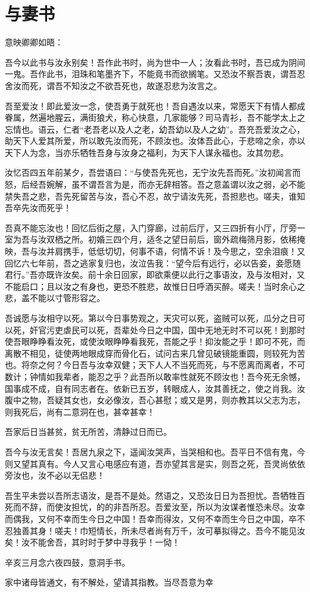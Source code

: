 \section{ 与妻书}

意映卿卿如晤：  

吾今以此书与汝永别矣！吾作此书时，尚为世中一人；汝看此书时，吾已成为阴间一鬼。吾作此书，泪珠和笔墨齐下，不能竟书而欲搁笔。又恐汝不察吾衷，谓吾忍舍汝而死，谓吾不知汝之不欲吾死也，故遂忍悲为汝言之。  

吾至爱汝！即此爱汝一念，使吾勇于就死也！吾自遇汝以来，常愿天下有情人都成眷属，然遍地腥云，满街狼犬，称心快意，几家能够？司马青衫，吾不能学太上之忘情也。语云，仁者“老吾老以及人之老，幼吾幼以及人之幼”。吾充吾爱汝之心，助天下人爱其所爱，所以敢先汝而死，不顾汝也。汝体吾此心，于悲啼之余，亦以天下人为念，当亦乐牺牲吾身与汝身之福利，为天下人谋永福也。汝其勿悲。  

汝忆否四五年前某夕，吾尝语曰：“与使吾先死也，无宁汝先吾而死。”汝初闻言而怒，后经吾婉解，虽不谓吾言为是，而亦无辞相答。吾之意盖谓以汝之弱，必不能禁失吾之悲，吾先死留苦与汝，吾心不忍，故宁请汝先死，吾担悲也。嗟夫，谁知吾卒先汝而死乎！  

吾真不能忘汝也！回忆后街之屋，入门穿廊，过前后厅，又三四折有小厅，厅旁一室为吾与汝双栖之所。初婚三四个月，适冬之望日前后，窗外疏梅筛月影，依稀掩映，吾与汝并肩携手，低低切切，何事不语，何情不诉！及今思之，空余泪痕！又回忆六七年前，吾之逃家复归也，汝泣告我：“望今后有远行，必以告妾，妾愿随君行。”吾亦既许汝矣。前十余日回家，即欲乘便以此行之事语汝，及与汝相对，又不能启口；且以汝之有身也，更恐不胜悲，故惟日日呼酒买醉。嗟夫！当时余心之悲，盖不能以寸管形容之。  

吾诚愿与汝相守以死。第以今日事势观之，天灾可以死，盗贼可以死，瓜分之日可以死，奸官污吏虐民可以死，吾辈处今日之中国，国中无地无时不可以死！到那时使吾眼睁睁看汝死，或使汝眼睁睁看我死，吾能之乎！抑汝能之乎！即可不死，而离散不相见，徒使两地眼成穿而骨化石，试问古来几曾见破镜能重圆，则较死为苦也。将奈之何？今日吾与汝幸双健；天下人人不当死而死，与不愿离而离者，不可数计；钟情如我辈者，能忍之乎？此吾所以敢率性就死不顾汝也！吾今死无余憾，国事成不成，自有同志者在。依新已五岁，转眼成人，汝其善抚之，使之肖我。汝腹中之物，吾疑其女也，女必像汝，吾心甚慰；或又是男，则亦教其以父志为志，则我死后，尚有二意洞在也，甚幸甚幸！  

吾家后日当甚贫，贫无所苦，清静过日而已。  

吾今与汝无言矣！吾居九泉之下，遥闻汝哭声，当哭相和也。吾平日不信有鬼，今则又望其真有。今人又言心电感应有道，吾亦望其言是实，则吾之死，吾灵尚依依旁汝也，汝不必以无侣悲！  

吾生平未尝以吾所志语汝，是吾不是处。然语之，又恐汝日日为吾担忧。吾牺牲百死而不辞，而使汝担忧，的的非吾所忍。吾爱汝至，所以为汝谋者惟恐未尽。汝幸而偶我，又何不幸而生今日之中国！吾幸而得汝，又何不幸而生今日之中国，卒不忍独善其身！嗟夫！巾短情长，所未尽者尚有万千，汝可摹拟得之。吾今不能见汝矣！汝不能舍吾，其时时于梦中寻我乎！一恸！  

辛亥三月念六夜四鼓，意洞手书。  

家中诸母皆通文，有不解处，望请其指教。当尽吾意为幸